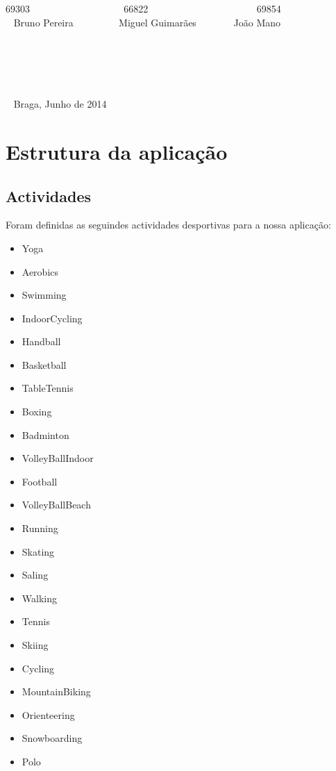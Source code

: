 \documentclass[10pt,notitlepage]{article}
\begin{document}
\begin{titlepage}
\begin{center}
69303 ~~~~~~~~~~~~~~~~~~ 66822 ~~~~~~~~~~~~~~~~~~~~~ 69854   \\~ Bruno Pereira  ~~~~~~~~ Miguel Guimarães ~~~~~~~João Mano  \\~ \\~ \\~ \\~ \\~ \\~ Braga, Junho de 2014
\end{center}
\end{titlepage}




\tableofcontents

\newpage


\section{Estrutura da aplicação}

\subsection{Actividades}
Foram definidas as seguindes actividades desportivas para a nossa aplicação:

\begin{itemize}
\item Yoga 
\item Aerobics
\item Swimming
\item IndoorCycling
\item Handball
\item Basketball
\item TableTennis
\item Boxing
\item Badminton
\item VolleyBallIndoor
\item Football
\item VolleyBallBeach
\item Running
\item Skating
\item Saling
\item Walking
\item Tennis
\item Skiing
\item Cycling
\item MountainBiking
\item Orienteering
\item Snowboarding
\item Polo
\end{itemize}
\end{document}
